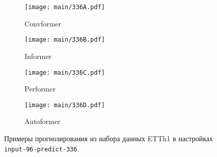 \begin{figure}[h!]
    \centering
    \begin{subfigure}[b]{0.24\textwidth}
        \centering
        \texttt{[image: main/336A.pdf]}
        \caption{Convformer}
        \label{fig:img1}
    \end{subfigure}
    \begin{subfigure}[b]{0.24\textwidth}
        \centering
        \texttt{[image: main/336B.pdf]}
        \caption{Informer}
        \label{fig:img2}
    \end{subfigure}
    \begin{subfigure}[b]{0.24\textwidth}
        \centering
        \texttt{[image: main/336C.pdf]}
        \caption{Performer}
        \label{fig:img3}
    \end{subfigure}
    \begin{subfigure}[b]{0.24\textwidth}
        \centering
        \texttt{[image: main/336D.pdf]}
        \caption{Autoformer}
        \label{fig:img4}
    \end{subfigure}
    
    \caption{Примеры прогнозирования из набора данных ETTh1 в настройках 
    \texttt{input-96-predict-336}.}
    \label{fig:four_images}
\end{figure}

  
